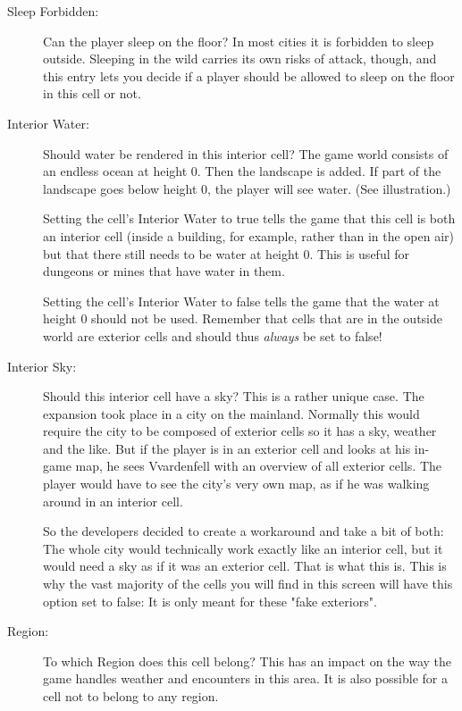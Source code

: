 \begin{description}
 \item[Sleep Forbidden:] Can the player sleep on the floor? In most cities it is forbidden to sleep outside. Sleeping in the wild carries its
 own risks of attack, though, and this entry lets you decide if a player should be allowed to sleep on the floor in this cell or not.
 
 \item[Interior Water:] Should water be rendered in this interior cell? The game world consists of an endless ocean at height 0. Then the landscape
 is added. If part of the landscape goes below height 0, the player will see water. (See illustration.)
 
 Setting the cell's Interior Water to true tells the game that this cell is both an interior cell (inside a building, for example, rather than
 in the open air) but that there still needs to be water at height 0. This is useful for dungeons or mines that have water in them.
 
 Setting the cell's Interior Water to false tells the game that the water at height 0 should not be used. Remember that cells that are in
 the outside world are exterior cells and should thus \textit{always} be set to false!
 
 \item[Interior Sky:] Should this interior cell have a sky? This is a rather unique case. The \TB{} expansion took place in a city on 
 the mainland. Normally this would require the city to be composed of exterior cells so it has a sky, weather and the like. But if the player is
 in an exterior cell and looks at his in-game map, he sees Vvardenfell with an overview of all exterior cells. The player would have to see
 the city's very own map, as if he was walking around in an interior cell.
 
 So the developers decided to create a workaround and take a bit of both: The whole city would technically work exactly like an interior cell,
 but it would need a sky as if it was an exterior cell. That is what this is. This is why the vast majority of the cells you will find in this screen
 will have this option set to false: It is only meant for these "fake exteriors".
 
 \item[Region:] To which Region does this cell belong? This has an impact on the way the game handles weather and encounters in this area.
 It is also possible for a cell not to belong to any region.
 
\end{description}

